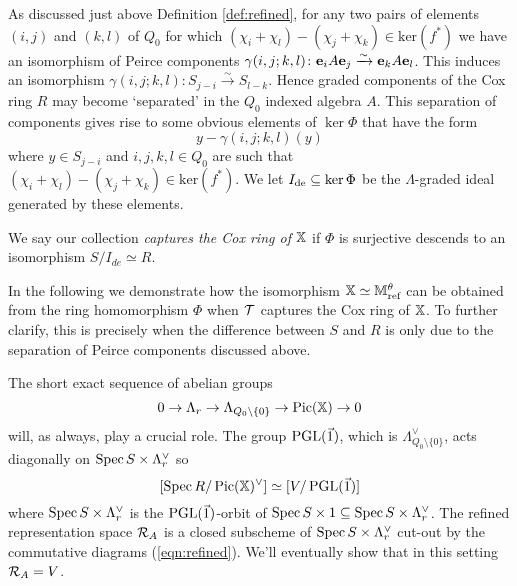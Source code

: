 \documentclass[12pt]{amsart}
\begin{document}
As discussed just above Definition \ref{def:refined}, for any two pairs of elements $(i,j)$ and $(k,l)$ of $Q_0$ for which $(\chi_i + \chi_l)-(\chi_j + \chi_k) \in \text{ker}(f^*)$ we have an isomorphism of Peirce components $\gamma(i,j;k,l) \colon \mathbf{e}_i A \mathbf{e}_j \xrightarrow{\sim} \mathbf{e}_k A \mathbf{e}_l$. 
This induces an isomorphism $\gamma(i,j;k,l) \colon S_{j-i} \xrightarrow{\sim} S_{l-k}$.
Hence graded components of the Cox ring $R$ may become `separated' in the $Q_0$ indexed algebra $A$.
This separation of components gives rise to some obvious elements of $\ker \Phi$ that have the form 
\begin{equation}  \label{eq:deindex}
    y - \gamma(i,j;k,l) (y)
\end{equation}
where $y \in S_{j-i}$ and $i,j,k,l \in Q_0$ are such that $(\chi_i + \chi_l)-(\chi_j + \chi_k) \in \text{ker}(f^*)$. 
We let $I_{\textup{de}}\subseteq \ker \Phi$ be the $\Lambda$-graded ideal generated by these elements.

\begin{definition}
We say our collection {\em captures the Cox ring of $\mathbb{X}$} if $\Phi$ is surjective descends to an isomorphism $S/I_{de} \simeq R$.
\end{definition}

In the following we demonstrate how the isomorphism $\mathbb{X} \simeq \mathbb{M}_{\text{ref}}^\theta$ can be obtained from the ring homomorphism $\Phi$ when $\mathcal{T}$ captures the Cox ring of $\mathbb{X}$.
To further clarify, this is precisely when the difference between $S$ and $R$ is only due to the separation of Peirce components discussed above.

The short exact sequence of abelian groups
\begin{equation} \label{eq:defineF}
     0 \to \Lambda_r \to \Lambda_{Q_0\setminus\{0\}} \to \operatorname{Pic}(\mathbb{X}) \to 0
\end{equation}
will, as always, play a crucial role.
The group $\operatorname{PGL}(\vec{1})$, which is $\Lambda_{Q_0\setminus\{0\}}^\vee$, acts diagonally on $\operatorname{Spec} S \times \Lambda_r^\vee$ so $$[\operatorname{Spec} R/\operatorname{Pic}(\mathbb{X})^\vee] \simeq [V/\operatorname{PGL}(\vec{1})]$$ where $\operatorname{Spec} S \times \Lambda_r^\vee$ is the $\operatorname{PGL}(\vec{1})$-orbit of $\operatorname{Spec} S \times 1 \subseteq \operatorname{Spec} S \times \Lambda_r^\vee$.
The refined representation space $\mathcal{R}_A$ is a closed subscheme of $\operatorname{Spec} S \times \Lambda_r^\vee$ cut-out by the commutative diagrams (\ref{eqn:refined}).
We'll eventually show that in this setting $\mathcal{R}_A = V$.
\end{document}
